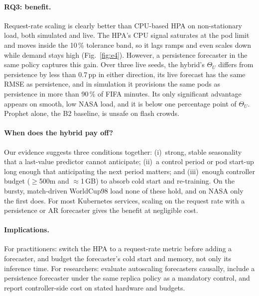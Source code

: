 \documentclass[conference,a4paper]{IEEEtran}
\begin{document}
\paragraph{RQ3: benefit.} Request-rate scaling is clearly better than CPU-based HPA on non-stationary load, both
simulated and live. The HPA's CPU signal saturates at the pod limit and moves inside the 10\,\% tolerance band, so
it lags ramps and even scales down while demand stays high (Fig.~\ref{fig:e4}). However, a persistence
forecaster in the same policy captures this gain. Over three live seeds, the hybrid's $\Theta_U$ differs from persistence by less than 0.7\,pp in either direction,
its live forecast has the same RMSE as persistence, and
in simulation it provisions the same pods as persistence in more than 90\,\% of FIFA minutes. Its only significant
advantage appears on smooth, low NASA load, and it is below one percentage point of $\Theta_U$. Prophet alone, the
B2 baseline, is unsafe on flash crowds.

\paragraph{When does the hybrid pay off?} Our evidence suggests three conditions together: (i)~strong, stable
seasonality that a last-value predictor cannot anticipate; (ii)~a control period or pod start-up long enough that
anticipating the next period matters; and (iii)~enough controller budget ($\geq$500m and $\approx$1\,GB) to absorb
cold start and re-training. On the bursty, match-driven WorldCup98 load none of these hold, and on NASA only the
first does. For most Kubernetes services, scaling on the request rate with a persistence or AR forecaster gives
the benefit at negligible cost.

\paragraph{Implications.} For practitioners: switch the HPA to a request-rate metric before adding a forecaster,
and budget the forecaster's cold start and memory, not only its inference time. For researchers: evaluate
autoscaling forecasters causally, include a persistence forecaster under the same replica policy as a mandatory
control, and report controller-side cost on stated hardware and budgets.

\end{document}
